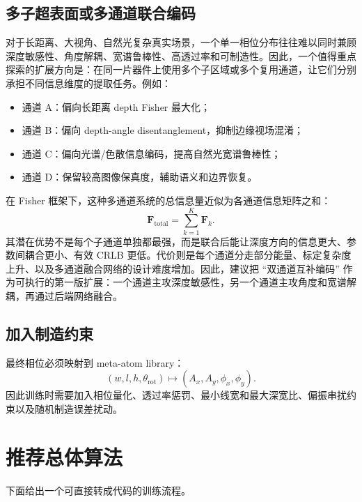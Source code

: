 \documentclass[11pt,a4paper,fontset=none]{ctexart}
\begin{document}
\subsection{多子超表面或多通道联合编码}

对于长距离、大视角、自然光复杂真实场景，一个单一相位分布往往难以同时兼顾深度敏感性、角度解耦、宽谱鲁棒性、高透过率和可制造性。因此，一个值得重点探索的扩展方向是：在同一片器件上使用多个子区域或多个复用通道，让它们分别承担不同信息维度的提取任务。例如：
\begin{itemize}
  \item 通道 A：偏向长距离 depth Fisher 最大化；
  \item 通道 B：偏向 depth-angle disentanglement，抑制边缘视场混淆；
  \item 通道 C：偏向光谱/色散信息编码，提高自然光宽谱鲁棒性；
  \item 通道 D：保留较高图像保真度，辅助语义和边界恢复。
\end{itemize}

在 Fisher 框架下，这种多通道系统的总信息量近似为各通道信息矩阵之和：
\begin{equation}
  \bm F_{\mathrm{total}}
  =
  \sum_{k=1}^{K}\bm F_k.
\end{equation}
其潜在优势不是每个子通道单独都最强，而是联合后能让深度方向的信息更大、参数间耦合更小、有效 CRLB 更低。代价则是每个通道分走部分能量、标定复杂度上升、以及多通道融合网络的设计难度增加。因此，建议把 ``双通道互补编码'' 作为可执行的第一版扩展：一个通道主攻深度敏感性，另一个通道主攻角度和宽谱解耦，再通过后端网络融合。

\subsection{加入制造约束}

最终相位必须映射到 meta-atom library：
\begin{equation}
  (w,l,h,\theta_{\mathrm{rot}})
  \mapsto
  (A_x,A_y,\phi_x,\phi_y).
\end{equation}
因此训练时需要加入相位量化、透过率惩罚、最小线宽和最大深宽比、偏振串扰约束以及随机制造误差扰动。

\section{推荐总体算法}

下面给出一个可直接转成代码的训练流程。
\end{document}
